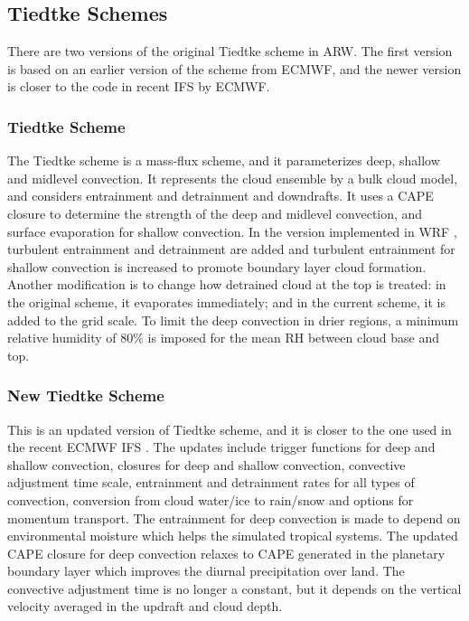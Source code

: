 \subsection{Tiedtke Schemes}

There are two versions of the original Tiedtke scheme \citep{tiedtke89} in ARW. The first version is based on an earlier version 
of the scheme from ECMWF, and the newer version is closer to the code in recent IFS by ECMWF.

\subsubsection{Tiedtke Scheme}

The Tiedtke scheme is a mass-flux scheme, and it parameterizes deep, 
shallow and midlevel convection. It represents the cloud ensemble by a bulk cloud model, 
and considers entrainment and detrainment and downdrafts. It uses a CAPE closure to 
determine the strength of the deep and midlevel convection, and surface evaporation 
for shallow convection. In the version implemented in WRF \citep{zhangc11}, turbulent 
entrainment and detrainment are added and turbulent entrainment for shallow convection 
is increased to promote boundary layer cloud formation. Another modification is to change 
how detrained cloud at the top is treated: in the original scheme, it evaporates immediately; 
and in the current scheme, it is added to the grid scale. To limit the deep convection in 
drier regions, a minimum relative humidity of 80\% is imposed for the mean RH between cloud base and top.

\subsubsection{New Tiedtke Scheme}

This is an updated version of Tiedtke scheme, and it is closer to the one used in the 
recent ECMWF IFS \citep{zhangc17}. The updates include trigger functions for deep and shallow convection, 
closures for deep and shallow convection, convective adjustment time scale, entrainment 
and detrainment rates for all types of convection, conversion from cloud water/ice to 
rain/snow and options for momentum transport. The entrainment for deep convection is 
made to depend on environmental moisture which helps the simulated tropical systems. 
The updated CAPE closure for deep convection relaxes to CAPE generated in the planetary 
boundary layer which improves the diurnal precipitation over land. The convective 
adjustment time is no longer a constant, but it depends on the vertical velocity averaged 
in the updraft and cloud depth.


